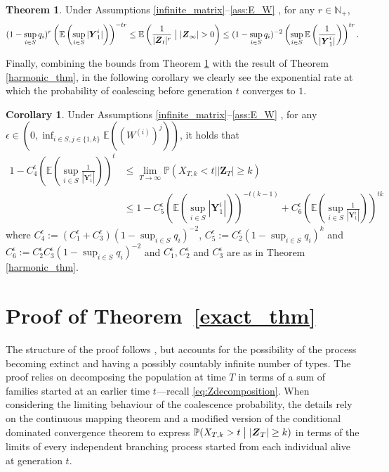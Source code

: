 \documentclass[preprint,3p,12pt]{elsarticle}
\theoremstyle{definition}
\newtheorem{theorem}{Theorem}
\newtheorem{corollary}{Corollary}[theorem]
\newcommand{\assumptions}{%
 \ref{infinite_matrix}--\ref{ass:E_W}
}
\begin{document}
\begin{theorem} \label{hs_thm}
    Under Assumptions \assumptions, for any $r \in \mathbb{N}_+$,
 \begin{equation*}
         (1-\sup_{i \in S} q_i)^r \left( \mathbb{E}\left(\sup_{i \in S} |\boldsymbol{Y}_1^i|\right) \right)^{-tr} \le 
    \mathbb{E}\left(\frac{1}{|\boldsymbol{Z}_t|^{r}}\bigm| |\boldsymbol{Z}_{\infty}| > 0\right) 
    \le (1-\sup_{i \in S} q_i)^{-2} \left(\sup_{i \in S} \mathbb{E}\left(\frac{1}{|\boldsymbol{Y}_1^i|}\right)\right)^{tr}.
 \end{equation*}
\end{theorem}
Finally, combining the bounds from Theorem \ref{hs_thm} with the result of Theorem \ref{harmonic_thm}, in the following corollary we clearly see the exponential rate at which the probability of coalescing before generation $t$ converges to $1$.
\begin{corollary}\label{corr:mainresult}
    Under Assumptions \assumptions, for any $ \epsilon \in (0, \inf_{i \in S, j \in \{1,k\}}{\mathbb{E}((W^{(i)})^j)})$, it holds that
    \begin{align*}
1 -C_4^{\epsilon}\left(\mathbb{E}\left( \sup_{i \in S}\frac{1}{|\boldsymbol{Y}_1^i|}\right)\right)^t
&\le \lim_{T \rightarrow \infty}\mathbb{P}(X_{T,k} < t| |\boldsymbol{Z}_T| \ge k ) \\
&\le
    1 - C_5^{\epsilon}\left(\mathbb{E}\left(\sup_{i \in S} |\boldsymbol{Y}_1^i|\right) \right)^{-t(k-1)}  + C_6^{\epsilon}\left(\mathbb{E}\left(\sup_{i \in S}\frac{1}{|\boldsymbol{Y}_1^i|}\right)\right)^{tk}
\end{align*}
where $C_4^{\epsilon} := (C_1^{\epsilon}+C_3^{\epsilon}) (1-\sup_{i \in S} q_i)^{-2}$, $C_5^{\epsilon} := C_2^{\epsilon} (1-\sup_{i \in S} q_i)^k 
    $ and $C_6^{\epsilon} := C_2^{\epsilon} C_3^{\epsilon} (1-\sup_{i \in S} q_i)^{-2}$ and $C_1^{\epsilon}, C_2^{\epsilon}$ and $C_3^{\epsilon}$ are as in Theorem \ref{harmonic_thm}.
\end{corollary}
\section{Proof of Theorem~\ref{exact_thm}}\label{exact_section}
The structure of the proof follows \cite{Hong2015}, but accounts for the possibility of the process becoming extinct and having a possibly  countably infinite number of types. The proof relies on decomposing the population at time $T$ in terms of a sum of families started at an earlier time $t$---recall \eqref{eq:Zdecomposition}. When considering the limiting behaviour of the coalescence probability, the details rely on the continuous mapping theorem and a modified version of the conditional dominated convergence theorem to express $\mathbb{P}(X_{T,k} > t \bigm|  |\boldsymbol{Z}_T| \ge k)$ in terms of the limits of every independent branching process started from each individual alive at generation $t$. 
\end{document}

